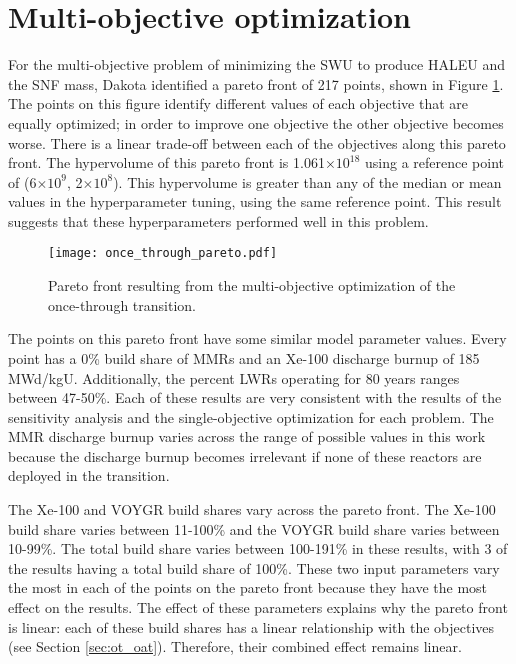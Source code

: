 \section{Multi-objective optimization}
For the multi-objective problem of minimizing the \gls{SWU} to produce 
\gls{HALEU} and the \gls{SNF} mass, Dakota identified a pareto front 
of 217 points, shown in Figure \ref{fig:once_through_pareto}. The points 
on this figure identify different values of each objective that are equally 
optimized; in order to improve one objective the other objective becomes 
worse. There is a linear trade-off between each of the objectives along this 
pareto front. 
The hypervolume of this pareto front is 1.061$\times 10^{18}$ using a 
reference point of (6$\times 10^9$, 2$\times 10^8$). This hypervolume is 
greater than any of the median or mean values in the hyperparameter tuning,
using the same reference point. This result suggests that these hyperparameters 
performed well in this problem. 


\begin{figure}[ht]
    \centering 
    \texttt{[image: once\_through\_pareto.pdf]}
    \caption{Pareto front resulting from the multi-objective optimization 
    of the once-through transition.}
    \label{fig:once_through_pareto}
\end{figure}

The points on this pareto front have some similar model parameter values. 
Every point has a 0\% build share of \glspl{MMR} and an Xe-100 discharge 
burnup of 185 MWd/kgU. Additionally, the percent \glspl{LWR} operating 
for 80 years ranges between 47-50\%. Each of these results are very 
consistent with the results of the sensitivity analysis and the 
single-objective optimization for each problem. The \gls{MMR} discharge burnup varies 
across the range of possible values in this work because the discharge 
burnup becomes irrelevant if none of these reactors are deployed in the
transition.

The Xe-100 and VOYGR build shares vary across the pareto front. The Xe-100 
build share varies between 11-100\% and the VOYGR build share varies 
between 10-99\%. The total build share varies between 100-191\% in these 
results, with 3 of the results having a total build share of 100\%. 
These two input parameters vary the most in each of the points on 
the pareto front because they have the most effect on the results. The effect of 
these parameters explains why the pareto front is linear: each of these 
build shares has a linear relationship with the objectives (see Section 
\ref{sec:ot_oat}). Therefore, their combined effect remains linear.

